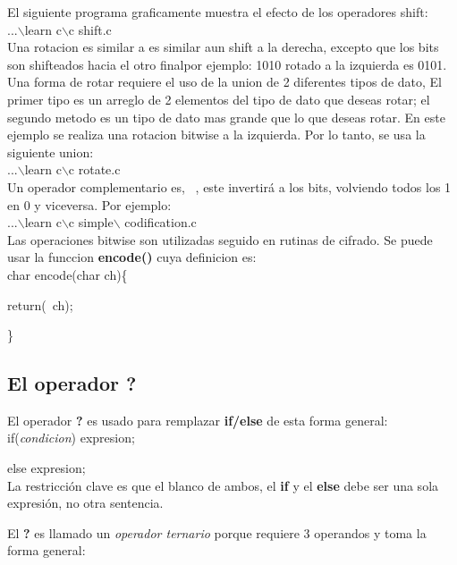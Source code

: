 \documentclass[]{article}
\begin{document}
			El siguiente programa graficamente muestra el efecto de los operadores shift:\\
			
			...$\backslash$learn c$\backslash$c shift.c\\
			
			Una rotacion es similar a es similar aun shift a la derecha, excepto que los bits son shifteados hacia el otro finalpor ejemplo: 1010 rotado a la izquierda es 0101. Una forma de rotar requiere el uso de la union de 2 diferentes tipos de dato, El primer tipo es un arreglo de 2 elementos del tipo de dato que deseas rotar; el segundo metodo es un tipo de dato mas grande que lo que deseas rotar. En este ejemplo se realiza una rotacion bitwise a la izquierda. Por lo tanto, se usa la siguiente union:\\
			
			...$\backslash$learn c$\backslash$c rotate.c\\
			
			Un operador complementario es, ~, este invertirá a los bits, volviendo todos los 1 en 0 y viceversa. Por ejemplo:\\
			
			...$\backslash$learn c$\backslash$c simple$\backslash$ codification.c\\
			
			Las operaciones bitwise son utilizadas seguido en rutinas de cifrado. Se puede usar la funccion \textbf{encode()} cuya definicion es:\\
			
			char encode(char ch)\{
			
			return(~ch);
			
			\}
			
			\subsection{El operador ?}
			
			El operador \textbf{?} es usado para remplazar \textbf{if/else} de esta forma general:\\
			
			if(\textit{condicion}) expresion;
			
			else expresion;\\
			
			La restricción clave es que el blanco de ambos, el \textbf{if} y el \textbf{else} debe ser una sola expresión, no otra sentencia.
			
			El \textbf{?} es llamado un \textit{operador ternario} porque requiere 3 operandos y toma la forma general:\\
			
\end{document}
